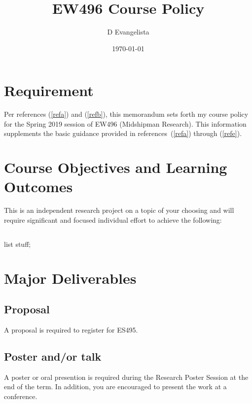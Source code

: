 \documentclass[10pt,courier]{navymemo}
\author{D Evangelista}
\title{EW496 Course Policy}
\date{\today}
\begin{document}
\makedateblock{}

\MEMORANDUM{}

\begin{navyletterheader}
\navyskip{}%

\navysubjline{}
\navyskip{}%
\end{navyletterheader}

\section{Requirement}
Per references (\ref{refa}) and (\ref{refb}), this memorandum sets forth my course policy for the Spring 2019 session of EW496 (Midshipman Research).  This information supplements the basic guidance provided in references~(\ref{refa}) through (\ref{refe}). 

\section{Course Objectives and Learning Outcomes}  This is an independent research project on a topic of your choosing and will require significant and focused individual effort to achieve the following:
\subsection{} list stuff;

\section{Major Deliverables}
\subsection{Proposal} A proposal is required to register for ES495.
\subsection{Poster and/or talk} A poster or oral presention is required during the Research Poster Session at the end of the term. In addition, you are encouraged to present the work at a conference. 
\end{document}
